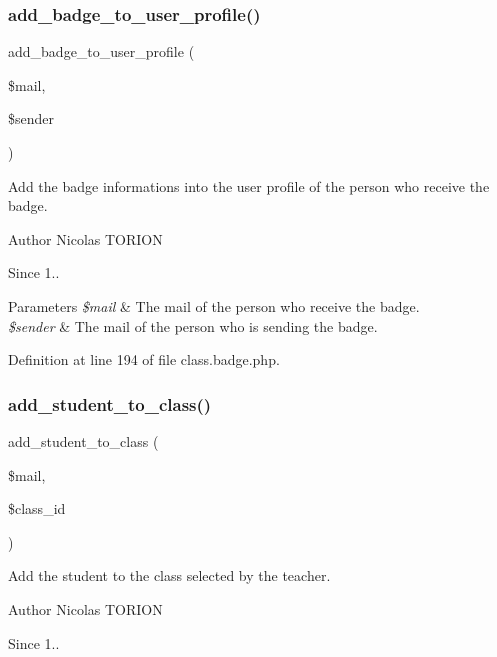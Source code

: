 \subsubsection{\texorpdfstring{add\+\_\+badge\+\_\+to\+\_\+user\+\_\+profile()}{add\_badge\_to\_user\_profile()}}
{\footnotesize\ttfamily add\+\_\+badge\+\_\+to\+\_\+user\+\_\+profile (\begin{DoxyParamCaption}\item[{}]{\$mail,  }\item[{}]{\$sender }\end{DoxyParamCaption})}

Add the badge informations into the user profile of the person who receive the badge.

\begin{DoxyAuthor}{Author}
Nicolas T\+O\+R\+I\+ON 
\end{DoxyAuthor}
\begin{DoxySince}{Since}
1.. 
\end{DoxySince}

\begin{DoxyParams}{Parameters}
{\em \$mail} & The mail of the person who receive the badge. \\
\hline
{\em \$sender} & The mail of the person who is sending the badge. \\
\hline
\end{DoxyParams}


Definition at line 194 of file class.\+badge.\+php.

\mbox{\label{class_badge_aa01bda205ac1364ddd4ab38d96336bd0}} 
\subsubsection{\texorpdfstring{add\+\_\+student\+\_\+to\+\_\+class()}{add\_student\_to\_class()}}
{\footnotesize\ttfamily add\+\_\+student\+\_\+to\+\_\+class (\begin{DoxyParamCaption}\item[{}]{\$mail,  }\item[{}]{\$class\+\_\+id }\end{DoxyParamCaption})}

Add the student to the class selected by the teacher.

\begin{DoxyAuthor}{Author}
Nicolas T\+O\+R\+I\+ON 
\end{DoxyAuthor}
\begin{DoxySince}{Since}
1.. 
\end{DoxySince}

